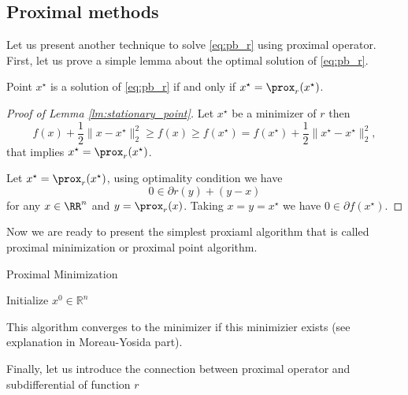 {\color{blue}\subsection{Proximal methods}
Let us present another technique to solve \eqref{eq:pb_r} using proximal operator. First, let us prove a simple lemma about the optimal solution of \eqref{eq:pb_r}.

\begin{lemma}\label{lm:stationary_point}
Point $x^\star$ is a solution of \eqref{eq:pb_r} if and only if $x^\star = \prox_r(x^\star)$.  
\end{lemma}
\begin{proof}[Proof of Lemma \ref{lm:stationary_point}]
Let $x^\star$ be a minimizer of $r$ then
$$
f(x) + \frac{1}{2}\|x-x^\star\|_2^2\geq f(x) \geq f(x^\star) = f(x^\star) + \frac{1}{2}\|x^\star - x^\star\|_2^2,
$$
that implies $x^\star = \prox_r(x^\star)$.

Let $x^\star = \prox_r(x^\star)$, using optimality condition we have 
$$
0\in \partial r(y) + (y-x)
$$
for any $x\in\RR^n$ and $y=\prox_r(x)$.
Taking $x=y = x^\star$ we have $0\in\partial f(x^\star)$.
\end{proof}
Now we are ready to present the simplest proxiaml algorithm that is called proximal minimization or proximal point algorithm.

\begin{algorithm}
    \caption{Proximal Minimization}
    \label{algo:pm}
    \begin{algorithmic}
        \STATE Initialize $x^0\in\mathbb{R}^n$
        \ENDFOR
    \end{algorithmic}
\end{algorithm}

This algorithm converges to the minimizer if this minimizier exists {\color{red}(see explanation in Moreau-Yosida part).} 

Finally, let us introduce the connection between proximal operator and subdifferential of function $r$

}
